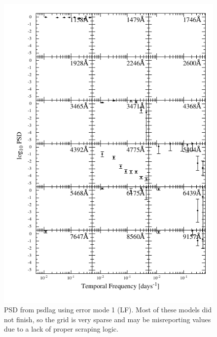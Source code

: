 \documentclass[11pt,letterpaper]{article}
\begin{document}
\begin{figure}
    \label{fig:psd_err1}
    \centering
    \includegraphics{../img/psd_atlas_err1.pdf}
    \caption{PSD from psdlag using error mode 1 (LF). Most of these models did not finish, so the grid is very sparse and may be misreporting values due to a lack of proper scraping logic.}
\end{figure}
\end{document}
